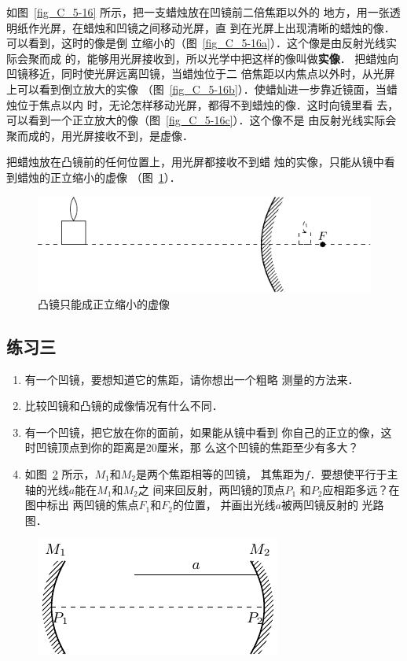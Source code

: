 如图~\ref{fig_C_5-16} 所示，把一支蜡烛放在凹镜前二倍焦距以外的
地方，用一张透明纸作光屏，在蜡烛和凹镜之间移动光屏，直
到在光屏上出现清晰的蜡烛的像．可以看到，这时的像是倒
立缩小的（图~\ref{fig_C_5-16a}）．这个像是由反射光线实际会聚而成
的，能够用光屏接收到，所以光学中把这样的像叫做\textbf{实像}．
把蜡烛向凹镜移近，同时使光屏远离凹镜，当蜡烛位于二
倍焦距以内焦点以外时，从光屏上可以看到倒立放大的实像
（图~\ref{fig_C_5-16b}）．使蜡灿进一步靠近镜面，当蜡烛位于焦点以内
时，无论怎样移动光屏，都得不到蜡烛的像．这时向镜里看
去，可以看到一个正立放大的像（图~\ref{fig_C_5-16c}）．这个像不是
由反射光线实际会聚而成的，用光屏接收不到，是虚像．

把蜡烛放在凸镜前的任何位置上，用光屏都接收不到蜡
烛的实像，只能从镜中看到蜡烛的正立缩小的虚像
（图~\ref{fig_C_5-17}）．
\begin{figure}[htbp]
    \centering
    \includegraphics{fig/C/5-17.pdf}
    \caption{凸镜只能成正立缩小的虚像}\label{fig_C_5-17}
\end{figure}

\subsection*{练习三}
\begin{enumerate}
    \item 有一个凹镜，要想知道它的焦距，请你想出一个粗略
        测量的方法来．
    \item 比较凹镜和凸镜的成像情况有什么不同．
    \item 有一个凹镜，把它放在你的面前，如果能从镜中看到
        你自己的正立的像，这时凹镜顶点到你的距离是20厘米，那
        么这个凹镜的焦距至少有多大？
    \item 如图~\ref{fig_C_5-18} 所示，$M_1$和$M_2$是两个焦距相等的凹镜，
    其焦距为$f$．要想使平行于主轴的光线$a$能在$M_1$和$M_2$之
    间来回反射，两凹镜的顶点$P_1$
    和$P_2$应相距多远？在图中标出
    两凹镜的焦点$F_1$和$F_2$的位置，
    并画出光线$a$被两凹镜反射的
    光路图．
\end{enumerate}

\begin{figure}[htbp]
    \centering
    \includegraphics{fig/C/5-18.pdf}
    \caption{}\label{fig_C_5-18}
\end{figure}
 
